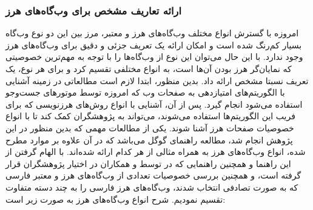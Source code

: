 \documentclass[twoside, a4paper,11pt]{book}
\numberwithin{equation}{chapter}
\numberwithin{table}{chapter}
\numberwithin{figure}{chapter}
\numberwithin{equation}{chapter}
\begin{document}
\subsubsection{ارائه تعاریف مشخص برای وب‌گاه‌های هرز}
امروزه با گسترش انواع مختلف وب‌گاه‌های هرز و معتبر، مرز بین این دو نوع وب‌گاه بسیار کم‌رنگ شده است و امکان ارائه یک تعریف جزئی و دقیق برای وب‌گاه‌های هرز وجود ندارد. با این حال می‌توان این نوع از وب‌گاه‌ها را با توجه به مهم‌ترین خصوصیتی که نمایان‌گر هرز بودن آن‌ها است، به انواع مختلفی تقسیم کرد و برای هر نوع، یک تعریف نسبتا مشخص ارائه داد. بدین منظور، ابتدا لازم است مطالعاتی در زمینه آشنایی با الگوریتم‌های امتیازدهی به صفحات وب که امروزه توسط موتورهای جست‌وجو استفاده می‌شود انجام گیرد. پس از آن، آشنایی با  انواع روش‌های هرزنویسی که برای فریب این الگوریتم‌ها استفاده می‌شوند، می‌تواند به پژوهشگران کمک کند تا با انواع خصوصیات صفحات هرز آشنا شوند. یکی از مطالعات مهمی که بدین منظور در این پژوهش انجام شد، مطالعه راهنمای گوگل  می‌باشد که در آن علاوه بر موارد مطرح شده، انواع وب‌گاه‌های هرز به همراه مثالی از هر کدام ارائه شده‌اند. با الهام گرفتن از این راهنما و همچنین راهنمایی که در    توسط  و همکاران \cite{castillo2006reference}  در اختیار پژوهشگران قرار گرفته است، و همچنین بررسی خصوصیات تعدادی از وب‌گاه‌های هرز و معتبر فارسی که به صورت تصادفی انتخاب شدند، وب‌گاه‌های هرز فارسی را به چند دسته متفاوت تقسیم نمودیم. شرح انواع وب‌گاه‌های هرز به صورت زیر است:
\end{document}
